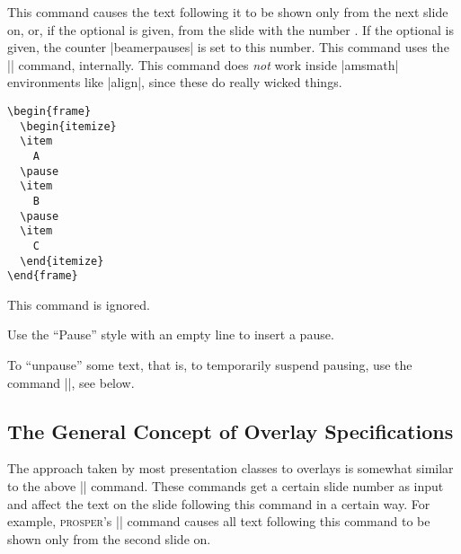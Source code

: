\begin{command}{\pause{}}
  This command causes the text following it to be shown only from the next slide on, or, if the optional  is given, from the slide with the number . If the optional  is given, the counter |beamerpauses| is set to this number. This command uses the |\onslide| command, internally. This command does \emph{not} work inside |amsmath| environments like |align|, since these do really wicked things.

  \example
\begin{verbatim}
\begin{frame}
  \begin{itemize}
  \item
    A
  \pause
  \item
    B
  \pause
  \item
    C
  \end{itemize}
\end{frame}
\end{verbatim}

  \articlenote
  This command is ignored.

  \lyxnote
  Use the ``Pause'' style with an empty line to insert a pause.
\end{command}

To ``unpause'' some text, that is, to temporarily suspend pausing, use the command |\onslide|, see below.


\subsection{The General Concept of Overlay Specifications}
\label{section-concept-overlays}

The approach taken by most presentation classes to overlays is somewhat similar to the above |\pause| command. These commands get a certain slide number as input and affect the text on the slide following this command in a certain way. For example, \textsc{prosper}'s || command causes all text following this command to be shown only from the second slide on.

